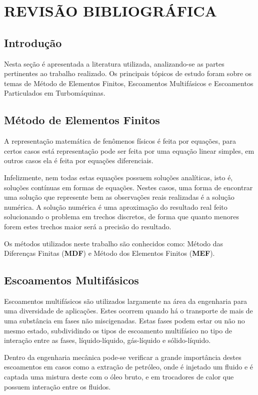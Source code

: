 \chapter{REVISÃO BIBLIOGRÁFICA}
\label{rev_bib}
\section{\textbf{Introdução}}
Nesta seção é apresentada a literatura utilizada, analizando-se as partes pertinentes ao trabalho realizado. Os principais tópicos de estudo foram sobre os temas de Método de Elementos Finitos, Escoamentos Multifásicos e Escoamentos Particulados em Turbomáquinas. 

\section{\textbf{Método de Elementos Finitos}}
A representação matemática de fenômenos físicos é feita por equações, para certos casos está representação pode ser feita por uma equação linear simples, em outros casos ela é feita por equações diferenciais.

Infelizmente, nem todas estas equações possuem soluções analíticas, isto é, soluções contínuas em formas de equações.
Nestes casos, uma forma de encontrar uma solução que represente bem as observações reais realizadas é a solução numérica.
A solução numérica é uma aproximação do resultado real feito solucionando o problema em trechos discretos, de forma que quanto menores forem estes trechos maior será a precisão do resultado.

Os métodos utilizados neste trabalho são conhecidos como: Método das Diferenças Finitas (\textbf{MDF}) e Método dos Elementos Finitos (\textbf{MEF}).




\section{\textbf{Escoamentos Multifásicos}}
Escoamentos multifásicos são utilizados largamente na área da engenharia para uma diversidade de aplicações.
Estes ocorrem quando há o transporte de mais de uma substância em fases não miscigenadas.
Estas fases podem estar ou não no mesmo estado, subdividindo os tipos de escoamento multifásico no tipo de interação entre as fases, líquido-líquido, gás-líquido e sólido-líquido.

Dentro da engenharia mecânica pode-se verificar a grande importância destes escoamentos em casos como a extração de petróleo, onde é injetado um fluido e é captada uma mistura deste com o óleo bruto, e em trocadores de calor que possuem interação entre os fluidos.

